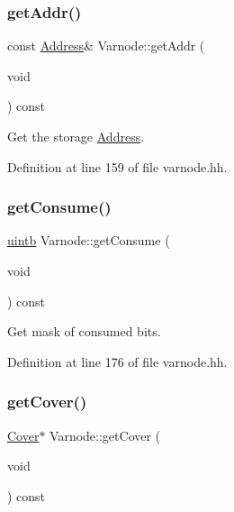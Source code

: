 \mbox{\label{class_varnode_a51db4f44a73d1173895d96d987df2d43}} 
\subsubsection{\texorpdfstring{getAddr()}{getAddr()}}
{\footnotesize\ttfamily const \mbox{\hyperlink{class_address}{Address}}\& Varnode\+::get\+Addr (\begin{DoxyParamCaption}\item[{void}]{ }\end{DoxyParamCaption}) const\hspace{0.3cm}{\ttfamily [inline]}}



Get the storage \mbox{\hyperlink{class_address}{Address}}. 



Definition at line 159 of file varnode.\+hh.

\mbox{\label{class_varnode_a3ca2401a56061b28f66d2231686c4780}} 
\subsubsection{\texorpdfstring{getConsume()}{getConsume()}}
{\footnotesize\ttfamily \mbox{\hyperlink{types_8h_a2db313c5d32a12b01d26ac9b3bca178f}{uintb}} Varnode\+::get\+Consume (\begin{DoxyParamCaption}\item[{void}]{ }\end{DoxyParamCaption}) const\hspace{0.3cm}{\ttfamily [inline]}}



Get mask of consumed bits. 



Definition at line 176 of file varnode.\+hh.

\mbox{\label{class_varnode_a0e03046ed77ca6463d0ff427f08acf7b}} 
\subsubsection{\texorpdfstring{getCover()}{getCover()}}
{\footnotesize\ttfamily \mbox{\hyperlink{class_cover}{Cover}}$\ast$ Varnode\+::get\+Cover (\begin{DoxyParamCaption}\item[{void}]{ }\end{DoxyParamCaption}) const\hspace{0.3cm}{\ttfamily [inline]}}



